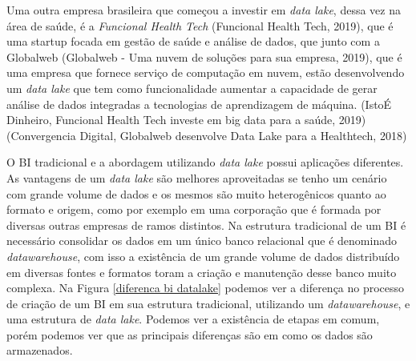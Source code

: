 \documentclass[
	12pt,				%
	openright,			%
	oneside,			%
	a4paper,			%
	chapter=TITLE,		%
	section=TITLE,		%
	subsection=TITLE,	%
	subsubsection=TITLE,%
	english,			%
	brazil				%
	]{abntex2}
\theoremstyle{definition}
\begin{document}
    Uma outra empresa brasileira que começou a investir em \textit{data lake}, dessa vez na área de saúde, é a \textit{Funcional Health Tech} (Funcional Health Tech, 2019), que é uma startup focada em gestão de saúde e análise de dados, que junto com a Globalweb (Globalweb - Uma nuvem de soluções para sua empresa, 2019), que é uma empresa que fornece serviço de computação em nuvem, estão desenvolvendo um \textit{data lake} que tem como funcionalidade aumentar a capacidade de gerar análise de dados integradas a tecnologias de aprendizagem de máquina. (IstoÉ Dinheiro, Funcional Health Tech investe em big data para a saúde, 2019) (Convergencia Digital, Globalweb desenvolve Data Lake para a Healthtech, 2018)
    
    O BI tradicional e a abordagem utilizando  \textit{data lake} possui aplicações diferentes. As vantagens de um \textit{data lake} são melhores aproveitadas se tenho um cenário com grande volume de dados e os mesmos são muito heterogênicos quanto ao formato e origem, como por exemplo em uma corporação que é formada por diversas outras empresas de ramos distintos. Na estrutura tradicional de um BI é necessário consolidar os dados em um único banco relacional que é denominado \textit{datawarehouse}, com isso a existência de um grande volume de dados distribuído em diversas fontes e formatos toram a criação e manutenção desse banco muito complexa. Na Figura \ref{diferenca bi datalake} podemos ver a diferença no processo de criação de um BI em sua estrutura tradicional, utilizando um \textit{datawarehouse}, e uma estrutura de \textit{data lake}. Podemos ver a existência de etapas em comum, porém podemos ver que as principais diferenças são em como os dados são armazenados. 
    
\end{document}
